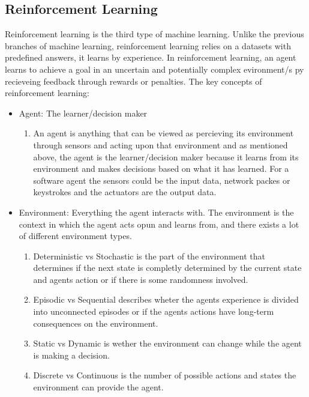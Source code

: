 \subsection{Reinforcement Learning}
Reinforcement learning is the third type of machine learning.
Unlike the previous branches of machine learning,
reinforcement learning relies on a datasets with predefined answers, it learns by experience.
In reinforcement learning, an agent learns to achieve a goal in
an uncertain and potentially complex evironment/s py recieveing feedback
through rewards or penalties. \cite{RL-GeeksForGeeks}
\newline
The key concepts of reinforcement learning:
\begin{itemize}
      \item Agent: The learner/decision maker
            \begin{enumerate}
                  \item An agent is anything that can be viewed as percieving its environment through
                        sensors and acting upon that environment and as mentioned above, the agent is the learner/decision maker because it
                        learns from its environment and makes decisions based on what it has learned.
                        For a software agent the sensors could be the input data, network packes or keystrokes
                        and the actuators are the output data. \cite{IntelligentAgents}
            \end{enumerate}
      \item Environment: Everything the agent interacts with. The environment is the context in which the agent acts opun and learns from,
            and there exists a lot of different environment types. \cite{IntelligentAgents}
            \begin{enumerate}
                  \item Deterministic vs Stochastic is the part of the environment that determines if the next state is completly
                        determined by the current state and agents action or if there is some randomness involved.
                  \item Episodic vs Sequential describes wheter the agents experience is divided into unconnected episodes or
                        if the agents actions have long-term consequences on the environment.
                  \item Static vs Dynamic is wether the environment can change while the agent is making a decision.
                  \item Discrete vs Continuous is the number of possible actions and states the environment can provide the agent.

\end{enumerate}
\end{itemize}
